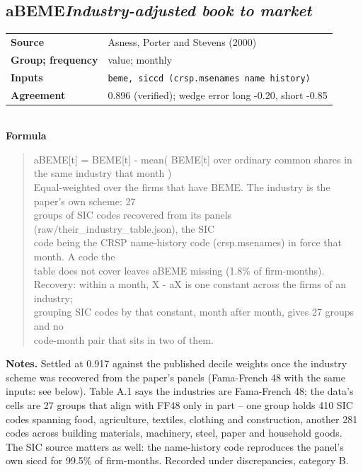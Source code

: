 \documentclass[11pt]{article}
\begin{document}
\subsection*{aBEME\quad\normalfont\itshape Industry-adjusted book to market}
\begin{tabular}{@{}p{3.3cm}p{12.3cm}@{}}
\textbf{Source} & Asness, Porter and Stevens (2000)\\
\textbf{Group; frequency} & value; monthly\\
\textbf{Inputs} & \texttt{beme, siccd (crsp.msenames name history)}\\
\textbf{Agreement} & 0.896 (verified); wedge error long -0.20, short -0.85\\
\end{tabular}\\[4pt]
\textbf{Formula}
\begin{quote}\small
aBEME[t] = BEME[t] - mean( BEME[t] over ordinary common shares in the same industry that month )\\
Equal-weighted over the firms that have BEME. The industry is the paper's own scheme: 27\\
groups of SIC codes recovered from its panels (raw/their\_industry\_table.json), the SIC\\
code being the CRSP name-history code (crsp.msenames) in force that month. A code the\\
table does not cover leaves aBEME missing (1.8\% of firm-months).\\
Recovery: within a month, X - aX is one constant across the firms of an industry;\\
grouping SIC codes by that constant, month after month, gives 27 groups and no\\
code-month pair that sits in two of them.\\

\end{quote}
\textbf{Notes.} Settled at 0.917 against the published decile weights once the industry scheme was recovered from the paper's panels (Fama-French 48 with the same inputs: see below). Table A.1 says the industries are Fama-French 48; the data's cells are 27 groups that align with FF48 only in part -- one group holds 410 SIC codes spanning food, agriculture, textiles, clothing and construction, another 281 codes across building materials, machinery, steel, paper and household goods. The SIC source matters as well: the name-history code reproduces the panel's own siccd for 99.5\% of firm-months. Recorded under discrepancies, category B.
\end{document}
